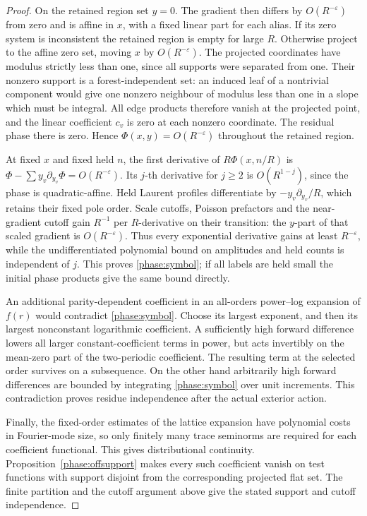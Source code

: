\begin{proof}
On the retained region set \(y=0\). The gradient then differs by \(O(R^{-\varepsilon})\) from zero and is affine in \(x\), with a fixed linear part for each alias. If its zero system is inconsistent the retained region is empty for large \(R\). Otherwise project to the affine zero set, moving \(x\) by \(O(R^{-\varepsilon})\). The projected coordinates have modulus strictly less than one, since all supports were separated from one. Their nonzero support is a forest-independent set: an induced leaf of a nontrivial component would give one nonzero neighbour of modulus less than one in a slope which must be integral. All edge products therefore vanish at the projected point, and the linear coefficient \(c_v\) is zero at each nonzero coordinate. The residual phase there is zero. Hence
\(\Phi(x,y)=O(R^{-\varepsilon})\) throughout the retained region.

At fixed \(x\) and fixed held \(n\), the first derivative of \(R\Phi(x,n/R)\) is
\(\Phi-\sum y_v\partial_{y_v}\Phi=O(R^{-\varepsilon})\).
Its \(j\)-th derivative for \(j\ge2\) is \(O(R^{1-j})\), since the phase is quadratic-affine. Held Laurent profiles differentiate by \(-y_v\partial_{y_v}/R\), which retains their fixed pole order. Scale cutoffs, Poisson prefactors and the near-gradient cutoff gain \(R^{-1}\) per \(R\)-derivative on their transition: the \(y\)-part of that scaled gradient is \(O(R^{-\varepsilon})\). Thus every exponential derivative gains at least \(R^{-\varepsilon}\), while the undifferentiated polynomial bound on amplitudes and held counts is independent of \(j\). This proves \eqref{phase:symbol}; if all labels are held small the initial phase products give the same bound directly.

An additional parity-dependent coefficient in an all-orders power--log expansion of \(f(r)\) would contradict \eqref{phase:symbol}. Choose its largest exponent, and then its largest nonconstant logarithmic coefficient. A sufficiently high forward difference lowers all larger constant-coefficient terms in power, but acts invertibly on the mean-zero part of the two-periodic coefficient. The resulting term at the selected order survives on a subsequence. On the other hand arbitrarily high forward differences are bounded by integrating \eqref{phase:symbol} over unit increments. This contradiction proves residue independence after the actual exterior action.

Finally, the fixed-order estimates of the lattice expansion have polynomial costs in Fourier-mode size, so only finitely many trace seminorms are required for each coefficient functional. This gives distributional continuity. Proposition~\ref{phase:offsupport} makes every such coefficient vanish on test functions with support disjoint from the corresponding projected flat set. The finite partition and the cutoff argument above give the stated support and cutoff independence.
\end{proof}

